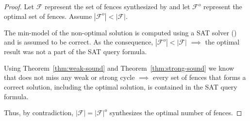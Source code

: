 {}
\begin{proof}
	Let $\mathcal{F}$ represent the set of fences synthesized by
	\ourtechnique and let $\mathcal{F}^o$ represent the optimal set
	of fences. Assume $|\mathcal{F}^o| < |\mathcal{F}|$.
	
	The min-model of the non-optimal solution is computed using a
	SAT solver (\z) and is assumed to be correct. As the consequence,
	$|\mathcal{F}^o| < |\mathcal{F}|$ $\implies$ the optimal result
	was not a part of the SAT query formula.
	
	Using Theorem~\ref{thm:weak-sound} and 
	Theorem~\ref{thm:strong-sound} we know that \ourtechnique does 
	not miss any weak or strong cycle
	$\implies$ every set of fences that forms a correct solution,
	including the optimal solution, is contained in the SAT query
	formula.
	
	Thus, by contradiction, $|\mathcal{F}| = |\mathcal{F}|^o$ \ie
	\ourtechnique synthesizes the optimal number of fences.
\end{proof}